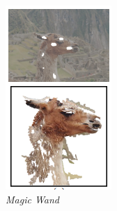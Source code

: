 \begin{figure}[H]
  \centering
    \begin{subfigure}{0.3\textwidth}
      \centering{}
      \includegraphics[width=\textwidth]{gambar/gambar-2_5(a).png}
      \caption{\emph{Magic Wand}}
    \end{subfigure}%
    \begin{subfigure}{0.3\textwidth}
      \centering{}

\end{subfigure}
\end{figure}

